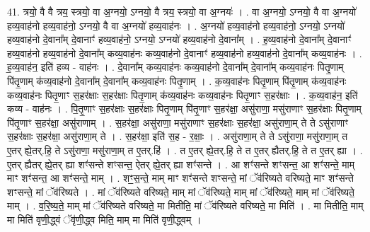 \documentclass[17pt]{extarticle}
\begin{document}
41. त्रयो॒ वै वै त्रय॒ स्त्रयो॒ वा अ॒ग्नयो॒ ऽग्नयो॒ वै त्रय॒ स्त्रयो॒ वा अ॒ग्नयः॑ । . वा अ॒ग्नयो॒ ऽग्नयो॒ वै वा अ॒ग्नयो॑ हव्य॒वाह॑नो हव्य॒वाह॑नो॒ ऽग्नयो॒ वै वा अ॒ग्नयो॑ हव्य॒वाह॑नः । . अ॒ग्नयो॑ हव्य॒वाह॑नो हव्य॒वाह॑नो॒ ऽग्नयो॒ ऽग्नयो॑ हव्य॒वाह॑नो दे॒वाना᳚म् दे॒वानाꣳ॑ हव्य॒वाह॑नो॒ ऽग्नयो॒ ऽग्नयो॑ हव्य॒वाह॑नो दे॒वाना᳚म् । . ह॒व्य॒वाह॑नो दे॒वाना᳚म् दे॒वानाꣳ॑ हव्य॒वाह॑नो हव्य॒वाह॑नो दे॒वाना᳚म् कव्य॒वाह॑नः कव्य॒वाह॑नो दे॒वानाꣳ॑ हव्य॒वाह॑नो हव्य॒वाह॑नो दे॒वाना᳚म् कव्य॒वाह॑नः । . ह॒व्य॒वाह॑न॒ इति॑ हव्य - वाह॑नः । . दे॒वाना᳚म् कव्य॒वाह॑नः कव्य॒वाह॑नो दे॒वाना᳚म् दे॒वाना᳚म् कव्य॒वाह॑नः पितृ॒णाम् पि॑तृ॒णाम् क॑व्य॒वाह॑नो दे॒वाना᳚म् दे॒वाना᳚म् कव्य॒वाह॑नः पितृ॒णाम् । . क॒व्य॒वाह॑नः पितृ॒णाम् पि॑तृ॒णाम् क॑व्य॒वाह॑नः कव्य॒वाह॑नः पितृ॒णाꣳ स॒हर॑क्षाः स॒हर॑क्षाः पितृ॒णाम् क॑व्य॒वाह॑नः कव्य॒वाह॑नः पितृ॒णाꣳ स॒हर॑क्षाः । . क॒व्य॒वाह॑न॒ इति॑ कव्य - वाह॑नः । . पि॒तृ॒णाꣳ स॒हर॑क्षाः स॒हर॑क्षाः पितृ॒णाम् पि॑तृ॒णाꣳ स॒हर॑क्षा॒ असु॑राणा॒ मसु॑राणाꣳ स॒हर॑क्षाः पितृ॒णाम् पि॑तृ॒णाꣳ स॒हर॑क्षा॒ असु॑राणाम् । . स॒हर॑क्षा॒ असु॑राणा॒ मसु॑राणाꣳ स॒हर॑क्षाः स॒हर॑क्षा॒ असु॑राणा॒म् ते ते ऽसु॑राणाꣳ स॒हर॑क्षाः स॒हर॑क्षा॒ असु॑राणा॒म् ते । . स॒हर॑क्षा॒ इति॑ स॒ह - र॒क्षाः॒ । . असु॑राणा॒म् ते ते ऽसु॑राणा॒ मसु॑राणा॒म् त ए॒तर् ह्ये॒तर्.हि॒ ते ऽसु॑राणा॒ मसु॑राणा॒म् त ए॒तर्.हि॑ । . त ए॒तर् ह्ये॒तर्.हि॒ ते त ए॒तर् ह्यैतर्.हि॒ ते त ए॒तर् ह्या । . ए॒तर् ह्यैतर् ह्ये॒तर् ह्या शꣳ॑सन्ते शꣳसन्त॒ ऐतर् ह्ये॒तर् ह्या शꣳ॑सन्ते । . आ शꣳ॑सन्ते शꣳसन्त॒ आ शꣳ॑सन्ते॒ माम् माꣳ शꣳ॑सन्त॒ आ शꣳ॑सन्ते॒ माम् । . शꣳ॒॒स॒न्ते॒ माम् माꣳ शꣳ॑सन्ते शꣳसन्ते॒ मां ॅव॑रिष्यते वरिष्यते॒ माꣳ शꣳ॑सन्ते शꣳसन्ते॒ मां ॅव॑रिष्यते । . मां ॅव॑रिष्यते वरिष्यते॒ माम् मां ॅव॑रिष्यते॒ माम् मां ॅव॑रिष्यते॒ माम् मां ॅव॑रिष्यते॒ माम् । . व॒रि॒ष्य॒ते॒ माम् मां ॅव॑रिष्यते वरिष्यते॒ मा मितीति॒ मां ॅव॑रिष्यते वरिष्यते॒ मा मिति॑ । . मा मितीति॒ माम् मा मिति॑ वृणी॒द्ध्वं ॅवृ॑णी॒द्ध्व मिति॒ माम् मा मिति॑ वृणी॒द्ध्वम् । \newline
\pagebreak
{}
\end{document}
